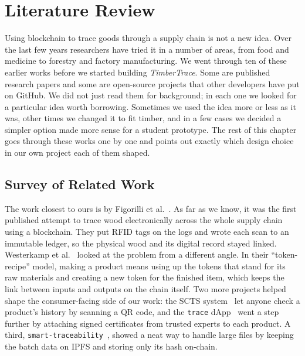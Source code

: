 \chapter{Literature Review}
\label{ch2-LiteratureReview}

Using blockchain to trace goods through a supply chain is not a new idea.
Over the last few years researchers have tried it in a number of areas,
from food and medicine to forestry and factory manufacturing. We went
through ten of these earlier works before we started building
\emph{TimberTrace}. Some are published research papers and some are
open-source projects that other developers have put on GitHub. We did not
just read them for background; in each one we looked for a particular idea
worth borrowing. Sometimes we used the idea more or less as it was, other
times we changed it to fit timber, and in a few cases we decided a simpler
option made more sense for a student prototype. The rest of this chapter
goes through these works one by one and points out exactly which design
choice in our own project each of them shaped.

\section{Survey of Related Work}

The work closest to ours is by Figorilli et al.~\cite{figorilli2018wood}.
As far as we know, it was the first published attempt to trace wood
electronically across the whole supply chain using a blockchain. They put
RFID tags on the logs and wrote each scan to an immutable ledger, so the
physical wood and its digital record stayed linked. Westerkamp et
al.~\cite{westerkamp2018token} looked at the problem from a different
angle. In their ``token-recipe'' model, making a product means using up
the tokens that stand for its raw materials and creating a new token for
the finished item, which keeps the link between inputs and outputs on the
chain itself. Two more projects helped shape the consumer-facing side of
our work: the SCTS system~\cite{scts} let anyone check a product's history
by scanning a QR code, and the \verb|trace| dApp~\cite{trace} went a step
further by attaching signed certificates from trusted experts to each
product. A third, \verb|smart-traceability|~\cite{smarttraceability},
showed a neat way to handle large files by keeping the batch data on IPFS
and storing only its hash on-chain.

